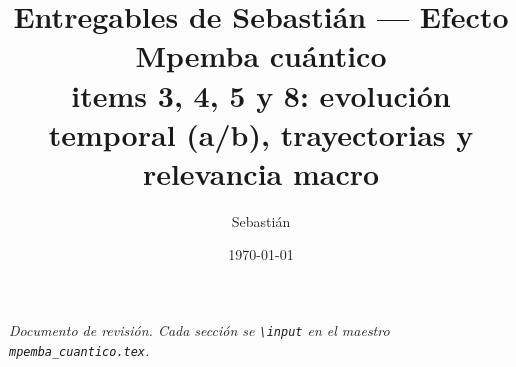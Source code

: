 \documentclass[11pt,a4paper]{article}
\title{\textbf{Entregables de Sebastián --- Efecto Mpemba cuántico}\\
\large items 3, 4, 5 y 8: evolución temporal (a/b), trayectorias y relevancia macro}
\author{Sebastián}
\date{\today}
\theoremstyle{definition}
\theoremstyle{plain}
\begin{document}
\maketitle
\begin{center}\itshape\small
Documento de revisión. Cada sección se \texttt{\textbackslash input} en el maestro
\texttt{mpemba\_cuantico.tex}.
\end{center}
\tableofcontents
\bigskip





\end{document}
